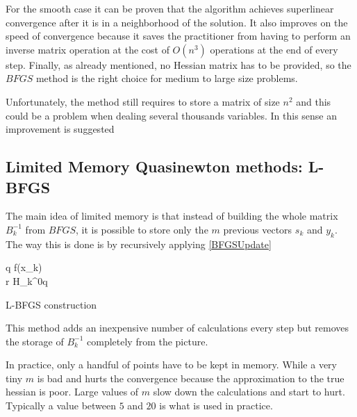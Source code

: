 For the smooth case it can be proven that the algorithm achieves superlinear convergence after it is in a neighborhood of the solution.  It also improves on the speed of convergence because it saves the practitioner from having to perform an inverse matrix operation at the cost of $O(n^3)$ operations at the end of every step.  Finally, as already mentioned, no Hessian matrix has to be provided, so the $BFGS$ method is the right choice for medium to large size problems.

Unfortunately, the method still requires to store a matrix of size $n^2$ and this could be a problem when dealing several thousands variables.  In this sense an improvement is suggested

\subsection{Limited Memory Quasinewton methods: L-BFGS }

The main idea of limited memory is that instead of building the whole matrix $B_k^{-1}$ from $BFGS$, it is possible to store only the $m$ previous vectors $s_k$ and $y_k$.  The way this is done is by recursively applying \ref{BFGSUpdate} \citep{nocedal}


\linesnumbered
\begin{algorithm}[H]
 \SetLine %
 q \leftarrow \nabla f(x_k)\\
 r \leftarrow H_k^0q \\
 \caption{L-BFGS construction\label{LBFGSalgo}}
\end{algorithm}

This method adds an inexpensive number of calculations every step but removes the storage of $B_k^{-1}$ completely from the picture.

In practice, only a handful of points have to be kept in memory.  While a very tiny $m$ is bad and hurts the convergence because the approximation to the true hessian is poor.  Large values of $m$ slow down the calculations and start to hurt.  Typically a value between $5$ and $20$ is what is used in practice.

